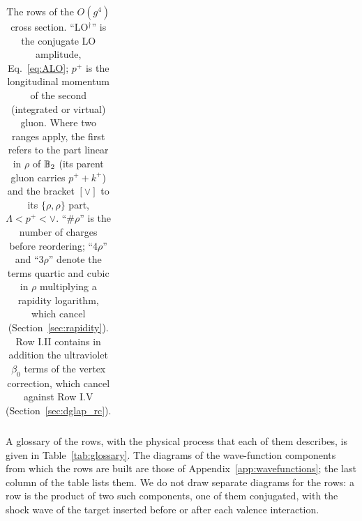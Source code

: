 \begin{table}[t]
\begin{tabular}{@{}l p{4.0cm} p{2.9cm} l p{3.4cm}@{}}
\bottomrule
\end{tabular}
\caption{The rows of the $O(g^4)$ cross section. ``LO$^\dagger$'' is the conjugate LO amplitude, Eq.~\eqref{eq:ALO}; $p^+$ is the longitudinal momentum of the second (integrated or virtual) gluon. Where two ranges apply, the first refers to the part linear in $\rho$ of $\mathbb{B}_2$ (its parent gluon carries $p^++k^+$) and the bracket $[\vee]$ to its $\{\rho,\rho\}$ part, $\Lambda<p^+<\vee$. ``$\#\rho$'' is the number of charges before reordering; ``4$\rho$'' and ``3$\rho$'' denote the terms quartic and cubic in $\rho$ multiplying a rapidity logarithm, which cancel (Section~\ref{sec:rapidity}). Row I.II contains in addition the ultraviolet $\beta_0$ terms of the vertex correction, which cancel against Row I.V (Section~\ref{sec:dglap_rc}).}
\label{tab:rows}
\end{table}

A glossary of the rows, with the physical process that each of them describes, is given in Table~\ref{tab:glossary}. The diagrams of the wave-function components from which the rows are built are those of Appendix~\ref{app:wavefunctions}; the last column of the table lists them. We do not draw separate diagrams for the rows: a row is the product of two such components, one of them conjugated, with the shock wave of the target inserted before or after each valence interaction.

